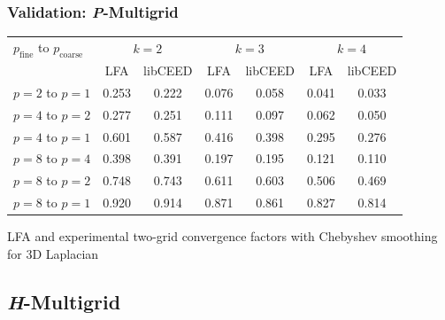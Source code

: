 \documentclass{beamer}
\begin{document}
\begin{frame}
\begin{center}
\frametitle{Validation: {\textit P}-Multigrid}

\begin{table}[ht!]
\begin{center}
\begin{tabular}{l cc cc cc}
  \toprule
  $p_{\text{fine}}$ to $p_{\text{coarse}}$  &  \multicolumn{2}{c}{$k = 2$}  &  \multicolumn{2}{c}{$k = 3$}  &  \multicolumn{2}{c}{$k = 4$}  \\
                      &  LFA  &  libCEED  &  LFA  &  libCEED  &  LFA  &  libCEED  \\
  \toprule
  $p = 2$ to $p = 1$  &  0.253 & 0.222  &  0.076 & 0.058  &  0.041 & 0.033  \\
  \midrule
  $p = 4$ to $p = 2$  &  0.277 & 0.251  &  0.111 & 0.097  &  0.062 & 0.050  \\
  $p = 4$ to $p = 1$  &  0.601 & 0.587  &  0.416 & 0.398  &  0.295 & 0.276  \\
  \midrule
  $p = 8$ to $p = 4$  &  0.398 & 0.391  &  0.197 & 0.195  &  0.121 & 0.110  \\
  $p = 8$ to $p = 2$  &  0.748 & 0.743  &  0.611 & 0.603  &  0.506 & 0.469  \\
  $p = 8$ to $p = 1$  &  0.920 & 0.914  &  0.871 & 0.861  &  0.827 & 0.814  \\
  \bottomrule
\end{tabular}
\end{center}
\label{table:two_grid_3d_chebyshev}
\end{table}
{\small LFA and experimental two-grid convergence factors with Chebyshev smoothing for 3D Laplacian}\\

\end{center}
\end{frame}


\subsection{{\textit H}-Multigrid}
\end{document}
